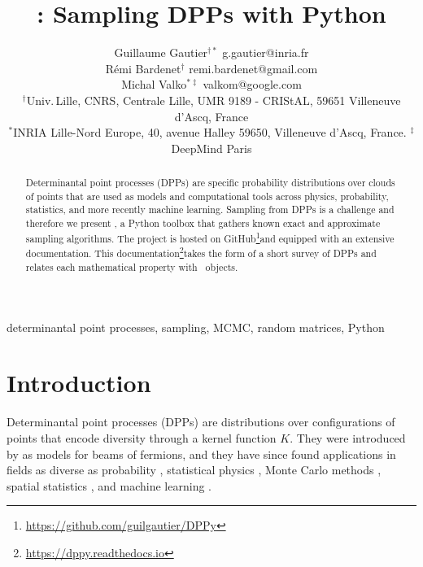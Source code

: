 \documentclass[twoside,11pt]{article}
\begin{document}
\title{\DPPy: Sampling DPPs with Python}

\author{\name Guillaume Gautier$^{\dagger*}$ \email g.gautier@inria.fr \\
       \name R\'emi Bardenet$^\dagger$ \email remi.bardenet@gmail.com \\
       \name Michal Valko$^{*\ddag}$ \email valkom@google.com\\
       \addr $^\dagger$Univ.\,Lille, CNRS, Centrale Lille, UMR 9189 - CRIStAL, 59651 Villeneuve d'Ascq, France\\
       \addr $^*$INRIA Lille-Nord Europe, 40, avenue Halley 59650, Villeneuve d'Ascq, France. \addr $^\ddag$DeepMind Paris
}

\editor{}

\maketitle

\setcounter{footnote}{3}
\begin{abstract}%
    Determinantal point processes (DPPs) are specific probability distributions over clouds of points that are used as models and computational tools across physics, probability, statistics, and more recently machine learning.
    Sampling from DPPs is a challenge and therefore we present \DPPy, a Python toolbox that gathers known exact and approximate sampling algorithms.
    The project is hosted on GitHub\!\footnote{\label{fn:github}\url{https://github.com/guilgautier/DPPy}}and equipped with an extensive documentation.
    This documentation\!\footnote{\label{fn:docs}\url{https://dppy.readthedocs.io}}takes the form of a short survey of DPPs and relates each mathematical property with \DPPy\ objects.
\end{abstract}

\begin{keywords}%
    determinantal point processes,
    sampling,
    MCMC,
    random matrices,
    Python
\end{keywords}

\section{Introduction} %
\label{sec:introduction}

    Determinantal point processes (DPPs) are distributions over configurations of points that encode diversity through a kernel function $K$.
    They were introduced by \citet{Mac75} as models for beams of fermions, and they have since found applications in fields as diverse as probability \citep{Sos00, Kon05, HKPV06}, statistical physics \citep{PaBe11}, Monte Carlo methods \citep{BaHa16}, spatial statistics \citep{LaMoRu15}, and machine learning \citep[ML,][]{KuTa12}.
\end{document}
